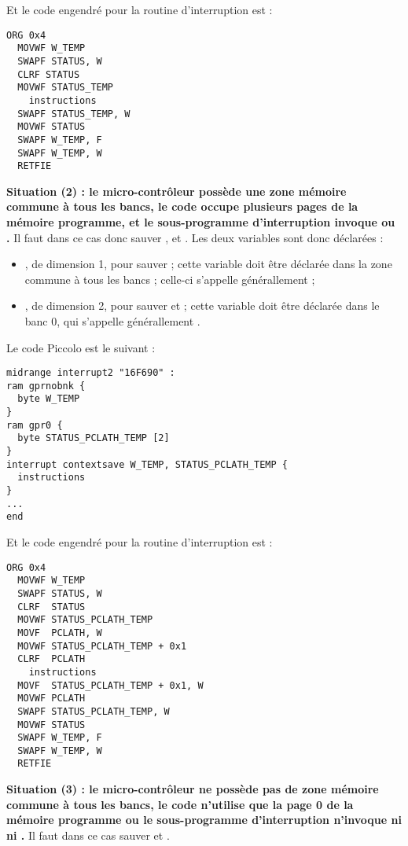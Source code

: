 Et le code engendré pour la routine d'interruption est :
\begin{lstlisting}[language=assembleur]
  ORG 0x4
  MOVWF W_TEMP
  SWAPF STATUS, W
  CLRF STATUS
  MOVWF STATUS_TEMP
    instructions
  SWAPF STATUS_TEMP, W
  MOVWF STATUS
  SWAPF W_TEMP, F
  SWAPF W_TEMP, W
  RETFIE
\end{lstlisting}



\textbf{Situation (2) : le micro-contrôleur possède une zone mémoire commune à tous les bancs, le code occupe plusieurs pages de la mémoire programme, et le sous-programme d'interruption invoque  ou .} Il faut dans ce cas donc sauver ,  et . Les deux variables sont donc déclarées :
\begin{itemize}
  \item {}, de dimension 1, pour sauver  ; cette variable doit être déclarée dans la zone commune à tous les bancs ; celle-ci s'appelle générallement  ; 
  \item {}, de dimension 2, pour sauver  et   ; cette variable doit être déclarée dans le banc 0, qui s'appelle générallement . 
\end{itemize}



Le code Piccolo est le suivant :
\begin{lstlisting}[language=piccolo]
midrange interrupt2 "16F690" :
ram gprnobnk {
  byte W_TEMP
}
ram gpr0 {
  byte STATUS_PCLATH_TEMP [2]
}
interrupt contextsave W_TEMP, STATUS_PCLATH_TEMP {
  instructions
}
...
end
\end{lstlisting}

Et le code engendré pour la routine d'interruption est :
\begin{lstlisting}[language=assembleur]
  ORG 0x4
  MOVWF W_TEMP
  SWAPF STATUS, W
  CLRF  STATUS
  MOVWF STATUS_PCLATH_TEMP
  MOVF  PCLATH, W
  MOVWF STATUS_PCLATH_TEMP + 0x1
  CLRF  PCLATH
    instructions
  MOVF  STATUS_PCLATH_TEMP + 0x1, W
  MOVWF PCLATH
  SWAPF STATUS_PCLATH_TEMP, W
  MOVWF STATUS
  SWAPF W_TEMP, F
  SWAPF W_TEMP, W
  RETFIE
\end{lstlisting}







\textbf{Situation (3) : le micro-contrôleur ne possède pas de zone mémoire commune à tous les bancs, le code n'utilise que la page 0 de la mémoire programme ou le sous-programme d'interruption n'invoque ni  ni .} Il faut dans ce cas sauver  et .

